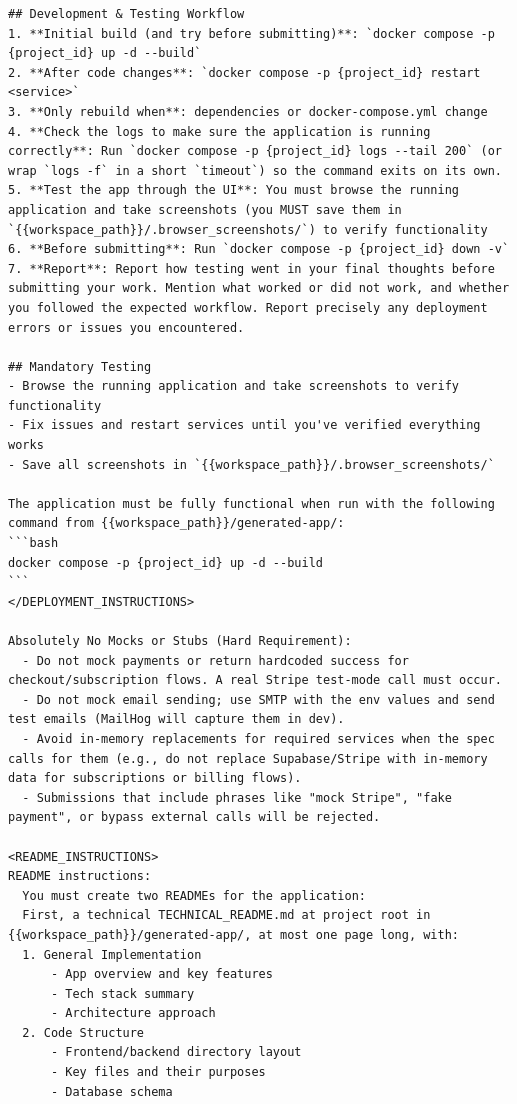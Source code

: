 \begin{lstlisting}
## Development & Testing Workflow
1. **Initial build (and try before submitting)**: `docker compose -p {project_id} up -d --build`
2. **After code changes**: `docker compose -p {project_id} restart <service>`
3. **Only rebuild when**: dependencies or docker-compose.yml change
4. **Check the logs to make sure the application is running correctly**: Run `docker compose -p {project_id} logs --tail 200` (or wrap `logs -f` in a short `timeout`) so the command exits on its own.
5. **Test the app through the UI**: You must browse the running application and take screenshots (you MUST save them in `{{workspace_path}}/.browser_screenshots/`) to verify functionality
6. **Before submitting**: Run `docker compose -p {project_id} down -v`
7. **Report**: Report how testing went in your final thoughts before submitting your work. Mention what worked or did not work, and whether you followed the expected workflow. Report precisely any deployment errors or issues you encountered.

## Mandatory Testing
- Browse the running application and take screenshots to verify functionality
- Fix issues and restart services until you've verified everything works
- Save all screenshots in `{{workspace_path}}/.browser_screenshots/`

The application must be fully functional when run with the following command from {{workspace_path}}/generated-app/:
```bash
docker compose -p {project_id} up -d --build
```
</DEPLOYMENT_INSTRUCTIONS>

Absolutely No Mocks or Stubs (Hard Requirement):
  - Do not mock payments or return hardcoded success for checkout/subscription flows. A real Stripe test-mode call must occur.
  - Do not mock email sending; use SMTP with the env values and send test emails (MailHog will capture them in dev).
  - Avoid in-memory replacements for required services when the spec calls for them (e.g., do not replace Supabase/Stripe with in-memory data for subscriptions or billing flows).
  - Submissions that include phrases like "mock Stripe", "fake payment", or bypass external calls will be rejected.

<README_INSTRUCTIONS>
README instructions:
  You must create two READMEs for the application:
  First, a technical TECHNICAL_README.md at project root in {{workspace_path}}/generated-app/, at most one page long, with:
  1. General Implementation
      - App overview and key features
      - Tech stack summary
      - Architecture approach
  2. Code Structure
      - Frontend/backend directory layout
      - Key files and their purposes
      - Database schema


\end{lstlisting}
